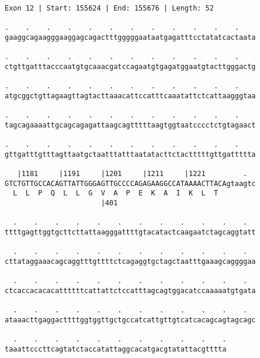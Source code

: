 \documentclass{article}
\begin{document}
\newpage
\begin{Verbatim}
Exon 12 | Start: 155624 | End: 155676 | Length: 52
 
.    .    .    .    .    .    .    .    .    .    .    .    
gaaggcagaagggaaggagcagactttgggggaataatgagatttcctatatcactaata
  
.    .    .    .    .    .    .    .    .    .    .    .    
ctgttgatttacccaatgtgcaaacgatccagaatgtgagatggaatgtacttgggactg
  
.    .    .    .    .    .    .    .    .    .    .    .    
atgcggctgttagaagttagtacttaaacattccatttcaaatattctcattaagggtaa
  
.    .    .    .    .    .    .    .    .    .    .    .    
tagcagaaaattgcagcagagattaagcagtttttaagtggtaatcccctctgtagaact
  
.    .    .    .    .    .    .    .    .    .    .    .    
gttgatttgtttagttaatgctaatttatttaatatacttctactttttgttgattttta
  
   |1181     |1191     |1201     |1211     |1221         .  
GTCTGTTGCCACAGTTATTGGGAGTTGCCCCAGAGAAGGCCATAAAACTTACAgtaagtc
  L  L  P  Q  L  L  G  V  A  P  E  K  A  I  K  L  T         
                       |401                                 
  
  .    .    .    .    .    .    .    .    .    .    .    .  
ttttgagttggtgcttcttattaagggattttgtacatactcaagaatctagcaggtatt
  
  .    .    .    .    .    .    .    .    .    .    .    .  
cttataggaaacagcaggtttgttttctcagaggtgctagctaatttgaaagcaggggaa
  
  .    .    .    .    .    .    .    .    .    .    .    .  
ctcaccacacacattttttcattattctccatttagcagtggacatccaaaaatgtgata
  
  .    .    .    .    .    .    .    .    .    .    .    .  
ataaacttgaggacttttggtggttgctgccatcattgttgtcatcacagcagtagcagc
  
  .    .    .    .    .    .    .    .    .    .    .
taaattcccttcagtatctaccatattaggcacatgacgtatattacgtttta
\end{Verbatim}
\newpage
\end{document}
